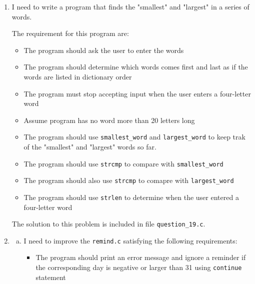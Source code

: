 \documentclass[12pt]{article}
\begin{document}
\begin{enumerate}[1.]
    \item

    I need to write a program that finds the "smallest" and "largest" in a series of
    words.

    \bigskip

    The requirement for this program are:

    \begin{itemize}
        \item The program should ask the user to enter the words
        \item The program should determine which words comes first and last as if the words are listed in dictionary order
        \item The program must stop accepting input when the user enters a four-letter word
        \item Assume program has no word more than 20 letters long
        \item The program should use \texttt{smallest\_word} and \texttt{largest\_word} to keep trak
        of the "smallest" and "largest" words so far.
        \item The program should use \texttt{strcmp} to compare with \texttt{smallest\_word}
        \item The program should also use \texttt{strcmp} to comapre with \texttt{largest\_word}
        \item The program should use \texttt{strlen} to determine when the user entered a four-letter word
    \end{itemize}

    \bigskip

    The solution to this problem is included in file \texttt{question\_19.c}.


    \item

    \begin{enumerate}[a)]
        \item

        I need to improve the \texttt{remind.c} satisfying the following requirements:

        \begin{itemize}
            \item The program should print an error message and ignore a reminder if the corresponding day is negative or larger than 31
            using \texttt{continue} statement
        \end{itemize}


\end{enumerate}
\end{enumerate}
\end{document}
